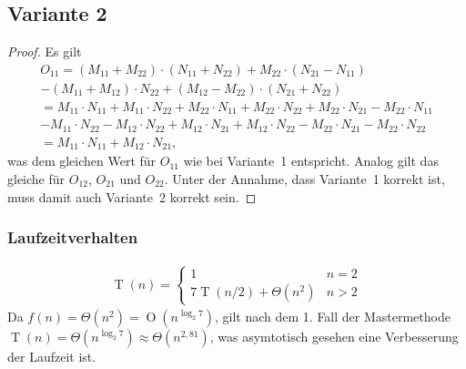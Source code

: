 \documentclass[a4paper]{article}
\newcommand{\BigO}{\operatorname{O}}
\newcommand{\T}{\operatorname{T}}
\begin{document}
    \subsection*{Variante 2}
    \label{subsec:variante2}
    \begin{proof}
        Es gilt
        \begin{multline*}
            O_{11} = (M_{11}+M_{22})\cdot(N_{11}+N_{22}) + M_{22}\cdot(N_{21}-N_{11}) \\
            - (M_{11} + M_{12}) \cdot N_{22} + (M_{12}-M_{22})\cdot(N_{21}+N_{22}) \\
            = M_{11}\cdot N_{11} + M_{11}\cdot N_{22} + M_{22}\cdot N_{11} + M_{22}\cdot N_{22} + M_{22}\cdot N_{21} - M_{22}\cdot N_{11} \\
            - M_{11}\cdot N_{22} - M_{12}\cdot N_{22} + M_{12}\cdot N_{21} + M_{12}\cdot N_{22} - M_{22}\cdot N_{21} - M_{22}\cdot N_{22} \\
            = M_{11} \cdot N_{11} + M_{12} \cdot N_{21}
            \text{,}
        \end{multline*}
        was dem gleichen Wert für $O_{11}$ wie bei Variante~1 entspricht. Analog gilt das gleiche für $O_{12}$, $O_{21}$ und $O_{22}$.
        Unter der Annahme, dass Variante~1 korrekt ist, muss damit auch Variante~2 korrekt sein.
    \end{proof}

    \subsubsection*{Laufzeitverhalten}
    \begin{align*}
        \T(n) =
        \begin{cases}
            1 & n = 2 \\
            7\T(n / 2) + \Theta(n^2) & n > 2
        \end{cases}
    \end{align*}
    Da $f(n) = \Theta(n^2) = \BigO(n^{\log_{2}{7}})$, gilt nach dem 1. Fall der Mastermethode $\T(n) = \Theta(n^{\log_2{7}}) \approx \Theta(n^{2{,}81})$, was asymtotisch gesehen eine Verbesserung der Laufzeit ist.
\end{document}
